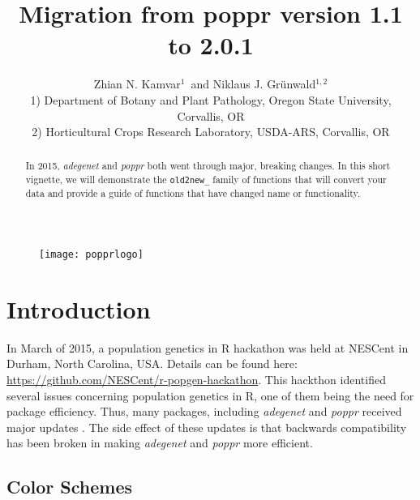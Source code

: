 \documentclass[letterpaper]{article}\usepackage[]{graphicx}\usepackage[]{color}
\title{Migration from poppr version 1.1 to 2.0.1}
\author{Zhian N. Kamvar$^{1}$\ and Niklaus J. Gr\"unwald$^{1,2}$\\\scriptsize{1)
Department of Botany and Plant Pathology, Oregon State University, Corvallis,
OR}\\\scriptsize{2) Horticultural Crops Research Laboratory, USDA-ARS,
Corvallis, OR}}
\newcommand{\poppr}{\textit{poppr}}
\newcommand{\Poppr}{\textit{Poppr}}
\newcommand{\adegenet}{\textit{adegenet}}
\begin{document}






\maketitle 
\begin{abstract} 
In 2015, \adegenet{} and \poppr{} both went through major, breaking changes.
In this short vignette, we will demonstrate the \texttt{old2new\_} family of
functions that will convert your data and provide a guide of functions that have
changed name or functionality. 
\end{abstract} 

\begin{figure}[b]   
  \centering
  \label{logo}   
  \texttt{[image: popprlogo]} 
\end{figure} 

\newpage 
\begingroup
  \hypersetup{linkcolor=black} 
  \tableofcontents 
\endgroup 

\section{Introduction}

In March of 2015, a population genetics in R hackathon was held at NESCent in 
Durham, North Carolina, USA. Details can be found here: 
\url{https://github.com/NESCent/r-popgen-hackathon}. This hackthon identified 
several issues concerning population genetics in R, one of them being the need
for package efficiency. Thus, many packages, including \adegenet{} and \poppr{}
received major updates \cite{kamvar2015novel}. The side effect of these updates 
is that backwards compatibility has been broken in making \adegenet{} and 
\poppr{} more efficient.

\subsection{Color Schemes}
\end{document}

